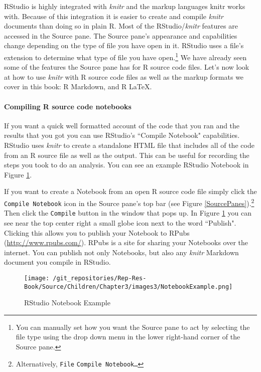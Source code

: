 RStudio is highly integrated with {\emph{knitr}} and the markup languages knitr works with. Because of this integration it is easier to create and compile {\emph{knitr}} documents than doing so in plain R. Most of the RStudio/{\emph{knitr}} features are accessed in the Source pane. The Source pane's appearance and capabilities change depending on the type of file you have open in it. RStudio uses a file's extension to determine what type of file you have open.\footnote{You can manually set how you want the Source pane to act by selecting the file type using the drop down menu in the lower right-hand corner of the Source pane.} We have already seen some of the features the Source pane has for R source code files. Let's now look at how to use {\emph{knitr}} with R source code files as well as the markup formats we cover in this book: R Markdown, and R LaTeX. \\[0.25cm]

\paragraph{Compiling R source code notebooks}

If you want a quick well formatted account of the code that you ran and the results that you got you can use RStudio's ``Compile Notebook" capabilities. RStudio uses {\emph{knitr}} to create a standalone HTML file that includes all of the code from an R source file as well as the output. This can be useful for recording the steps you took to do an analysis. You can see an example RStudio Notebook in Figure \ref{NotebookExample}. 

If you want to create a Notebook from an open R source code file simply click the \texttt{Compile Notebook} icon in the Source pane's top bar (see Figure \ref{SourcePanes}).\footnote{Alternatively, \texttt{File} \textrightarrow \; \texttt{Compile Notebook\ldots}} Then click the \texttt{Compile} button in the window that pops up. In Figure \ref{NotebookExample} you can see near the top center right a small globe icon next to the word ``Publish". Clicking this allows you to publish your Notebook to RPubs (\url{http://www.rpubs.com/}). RPubs is a site for sharing your Notebooks over the internet. You can publish not only Notebooks, but also any {\emph{knitr}} Markdown document you compile in RStudio.

\begin{figure}
    \caption{RStudio Notebook Example}
    \label{NotebookExample}
    \begin{center}
    
\texttt{[image: /git\_repositories/Rep-Res-Book/Source/Children/Chapter3/images3/NotebookExample.png]}
    \end{center}
\end{figure}

